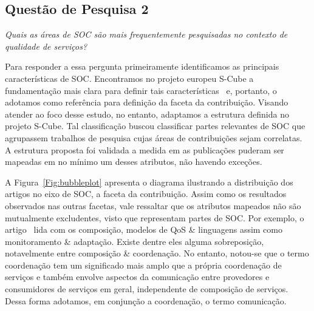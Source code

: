 \subsection{Quest\~{a}o de Pesquisa 2}
\emph{Quais as áreas de SOC são mais frequentemente pesquisadas no contexto de qualidade de serviços?}


Para responder a essa pergunta primeiramente identificamos as principais caracter\'{i}sticas de SOC. Encontramos no projeto europeu S-Cube a fundamenta\c{c}\~{a}o mais clara para definir tais caracter\'{i}sticas~\cite{SCube-FINALREPORT} e, portanto, o adotamos como refer\^{e}ncia para definição da faceta da contribui\c{c}\~{a}o. Visando atender ao foco desse estudo, no entanto, adaptamos a estrutura definida no projeto S-Cube. Tal classificação buscou classificar partes relevantes de SOC que agrupassem trabalhos de pesquisa cujas áreas de contribuições sejam correlatas. A estrutura proposta foi validada a medida em as publicações puderam ser mapeadas em no mínimo um desses atributos, não havendo exceções. 


A Figura~\ref{Fig:bubbleplot} apresenta o diagrama ilustrando a distribui\c{c}\~{a}o dos artigos no eixo de SOC, a faceta da contribui\c{c}\~{a}o. Assim como os resultados observados nas outras facetas, vale ressaltar que os atributos mapeados não são mutualmente excludentes, visto que representam partes de SOC. Por exemplo, o artigo~\cite{A QoS-aware fault tolerant middleware for dependable service composition} lida com os composi\c{c}\~{a}o, modelos de QoS \& linguagens assim como monitoramento \& adapta\c{c}\~{a}o. Existe dentre eles alguma sobreposição, notavelmente entre composição \& coordenação. No entanto, notou-se que o termo coordenação tem um significado mais amplo que a própria coordenação de serviços e também envolve aspectos da comunicação entre provedores e consumidores de serviços em geral, independente de composição de serviços. Dessa forma adotamos, em conjunção a coordenação, o termo comunicação.


